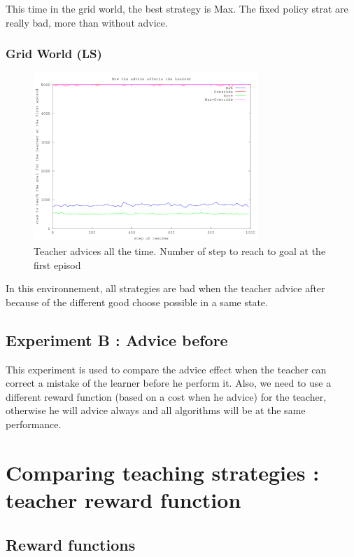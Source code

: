 \documentclass[a4paper,12pt]{article}
\begin{document}
      This time in the grid world, the best strategy is Max.
      The fixed policy strat are really bad, more than without advice.
      
      \subsubsection{Grid World (LS)}
      \begin{figure}[H]
      \begin{center}
	\includegraphics[width=320px]{graphA_LA}
	\caption{ Teacher advices all the time. Number of step to reach to goal at the first episod }
	\end{center}
      \end{figure}
      
      In this environnement, all strategies are bad when the teacher advice after because of 
      the different good choose possible in a same state.
      
      
      \subsection{Experiment B : Advice before}
      
      This experiment is used to compare the advice effect when the teacher can correct a mistake of the 
      learner before he perform it.
      Also, we need to use a different reward function (based on a cost when he advice) for the teacher, 
      otherwise he will advice always and all algorithms will be at the same performance.
      
      \section{Comparing teaching strategies : teacher reward function}
      
      \subsection{Reward functions}
%        
\end{document}
